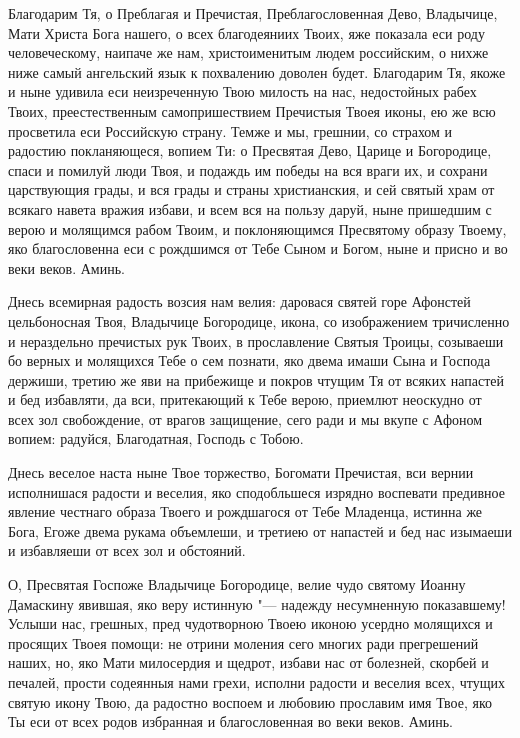 Благодарим Тя, о Преблагая и Пречистая, Преблагословенная Дево, Владычице, Мати Христа Бога нашего, о всех благодеяниих Твоих, яже показала еси роду человеческому, наипаче же нам, христоименитым людем российским, о нихже ниже самый ангельский язык к похвалению доволен будет. Благодарим Тя, якоже и ныне удивила еси неизреченную Твою милость на нас, недостойных рабех Твоих, преестественным самопришествием Пречистыя Твоея иконы, ею же всю просветила еси Российскую страну. Темже и мы, грешнии, со страхом и радостию покланяющеся, вопием Ти: о Пресвятая Дево, Царице и Богородице, спаси и помилуй люди Твоя, и подаждь им победы на вся враги их, и сохрани царствующия грады, и вся грады и страны христианския, и сей святый храм от всякаго навета вражия избави, и всем вся на пользу даруй, ныне пришедшим с верою и молящимся рабом Твоим, и поклоняющимся Пресвятому образу Твоему, яко благословенна еси с рождшимся от Тебе Сыном и Богом, ныне и присно и во веки веков. Аминь.
\mychapterending

 




Днесь всемирная радость возсия нам велия: даровася святей горе Афонстей цельбоносная Твоя, Владычице Богородице, икона, со изображением тричисленно и нераздельно пречистых рук Твоих, в прославление Святыя Троицы, созываеши бо верных и молящихся Тебе о сем познати, яко двема имаши Сына и Господа держиши, третию же яви на прибежище и покров чтущим Тя от всяких напастей и бед избавляти, да вси, притекающий к Тебе верою, приемлют неоскудно от всех зол свобождение, от врагов защищение, сего ради и мы вкупе с Афоном вопием: радуйся, Благодатная, Господь с Тобою. 




Днесь веселое наста ныне Твое торжество, Богомати Пречистая, вси вернии исполнишася радости и веселия, яко сподобльшеся изрядно воспевати предивное явление честнаго образа Твоего и рождшагося от Тебе Младенца, истинна же Бога, Егоже двема рукама объемлеши, и третиею от напастей и бед нас изымаеши и избавляеши от всех зол и обстояний.




О, Пресвятая Госпоже Владычице Богородице, велие чудо святому Иоанну Дамаскину явившая, яко веру истинную "--- надежду несумненную показавшему! Услыши нас, грешных, пред чудотворною Твоею иконою усердно молящихся и просящих Твоея помощи: не отрини моления сего многих ради прегрешений наших, но, яко Мати милосердия и щедрот, избави нас от болезней, скорбей и печалей, прости содеянныя нами грехи, исполни радости и веселия всех, чтущих святую икону Твою, да радостно воспоем и любовию прославим имя Твое, яко Ты еси от всех родов избранная и благословенная во веки веков. Аминь.


